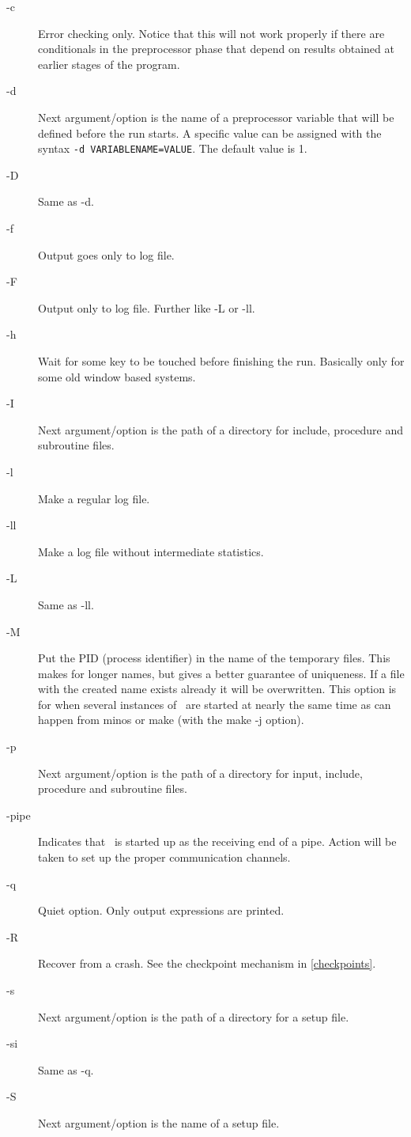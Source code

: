 \begin{description}
\item[-c] Error checking only. Notice that this will not work 
     properly if there are conditionals in the preprocessor phase that 
     depend on results obtained at earlier stages of the program.
\item[-d] Next argument/option is the name of a preprocessor 
     variable that will be defined before the run starts. A specific value can be assigned with the
	 syntax {\tt -d VARIABLENAME=VALUE}. The default value is 1.
\item[-D] Same as -d.
\item[-f] Output goes only to log file.
\item[-F] Output only to log file. Further like -L or -ll.
\item[-h] Wait for some key to be touched before finishing the run.
     Basically only for some old window based systems.
\item[-I] Next argument/option is the path of a directory for 
     include, procedure and subroutine files.
\item[-l] Make a regular log file.
\item[-ll] Make a log file without intermediate statistics.
\item[-L] Same as -ll.
\item[-M] Put the PID (process identifier) in the name of the temporary 
     files. This makes for longer names, but gives a better guarantee of 
     uniqueness. If a file with the created name exists already it will be 
     overwritten. This option is for when several instances of \FORM\ are 
     started at nearly the same time as can happen from minos or make (with 
     the make -j option).
\item[-p] Next argument/option is the path of a directory for 
     input, include, procedure and subroutine files.
\item[-{pipe}] Indicates that \FORM\ is started up as the receiving 
     end of a pipe. Action will be taken to set up the proper communication 
     channels.
\item[-q] Quiet option. Only output expressions are printed.
\item[-R] Recover from a crash. See the checkpoint mechanism in 
     \ref{checkpoints}.
\item[-s] Next argument/option is the path of a directory for a 
     setup file.
\item[-si] Same as -q.
\item[-S] Next argument/option is the name of a setup file.

\end{description}
